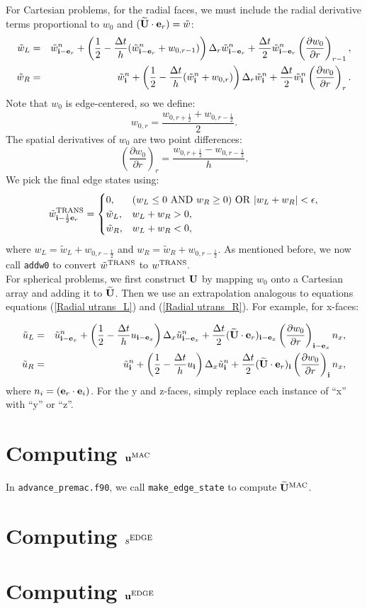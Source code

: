 \documentclass[11pt]{article}
\def\half  {\frac{1}{2}}
\def\dt    {\Delta t}
\def\edge  {\rm EDGE}
\def\mac   {\rm MAC}
\def\trans {\rm TRANS}
\def\eb    {{\bf e}}
\def\ib    {{\bf i}}
\def\ub    {{\bf u}}
\def\Ub    {{\bf U}}
\def\Ubt   {\widetilde{\bf U}}
\def\ut    {\tilde{u}}
\def\wt    {\tilde{w}}
\begin{document}
For Cartesian problems, for the radial faces, we must include the radial derivative terms proportional to $w_0$ and $(\Ubt\cdot\eb_r) = \wt$:
\begin{eqnarray}
\wt_L &=& \wt_{\ib-\eb_r}^n + \left(\half - \frac{\dt}{h}(\wt_{\ib-\eb_r}^n+w_{0,r-1})\right)\Delta_r \wt_{\ib-\eb_r}^n + \frac{\dt}{2}\wt_{\ib-\eb_r}^n\left(\frac{\partial w_0}{\partial r}\right)_{r-1},\label{Radial utrans_L} \\
\wt_R &=& \wt_{\ib}^n + \left(\half - \frac{\dt}{h}(\wt_{\ib}^n+w_{0,r})\right)\Delta_r \wt_{\ib}^n + \frac{\dt}{2}\wt_{\ib}^n\left(\frac{\partial w_0}{\partial r}\right)_r.\label{Radial utrans_R}
\end{eqnarray}
Note that $w_0$ is edge-centered, so we define:
\begin{equation}
w_{0,r} = \frac{w_{0,r+\half}+w_{0,r-\half}}{2}.
\end{equation}
The spatial derivatives of $w_0$ are two point differences:
\begin{equation}
\left(\frac{\partial w_0}{\partial r}\right)_r = \frac{w_{0,r+\half}-w_{0,r-\half}}{h}.
\end{equation}
We pick the final edge states using:
\begin{equation}
\wt^{\trans}_{\ib-\half\eb_r} =
\begin{cases}
0, & (w_L \le 0 ~ {\rm AND} ~ w_R \ge 0) ~ {\rm OR} ~ |w_L + w_R| < \epsilon, \\
\wt_L, & w_L + w_R > 0, \\
\wt_R, & w_L + w_R < 0, \\
\end{cases}
\end{equation}
where $w_L = \wt_L + w_{0,r-\half}$ and $w_R = \wt_R + w_{0,r-\half}$.  As mentioned before, we now call {\tt addw0} to convert $\wt^{\trans}$ to $w^{\trans}.$\\

For spherical problems, we first construct $\Ub$ by mapping $w_0$ onto a Cartesian array and adding it to $\Ubt$.  Then we use an extrapolation analogous to equations equations (\ref{Radial utrans_L}) and (\ref{Radial utrans_R}).  For example, for x-faces:

\begin{eqnarray}
\ut_L &=& \ut_{\ib-\eb_x}^n + \left(\half - \frac{\dt}{h}u_{\ib-\eb_x}\right)\Delta_x\ut_{\ib-\eb_x}^n + \frac{\dt}{2}(\Ubt\cdot\eb_r)_{\ib-\eb_x}\left(\frac{\partial w_0}{\partial r}\right)_{\ib-\eb_x}n_x, \\
\ut_R &=& \ut_{\ib}^n + \left(\half - \frac{\dt}{h}u_{\ib}\right)\Delta_x\ut_{\ib}^n + \frac{\dt}{2}(\Ubt\cdot\eb_r)_{\ib}\left(\frac{\partial w_0}{\partial r}\right)_{\ib}n_x,
\end{eqnarray}
where $n_i = (\eb_r\cdot\eb_i)$.  For the y and z-faces, simply replace each instance of ``x'' with ``y'' or ``z''.
\section{Computing $\ub^{\mac}$}
In {\tt advance\_premac.f90}, we call {\tt make\_edge\_state} to compute $\Ubt^{\mac}$.
\section{Computing $s^{\edge}$}
\section{Computing $\ub^{\edge}$}
\end{document}
